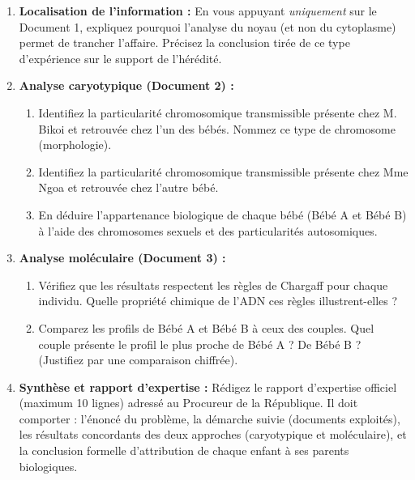 \documentclass[11pt]{article}
\newcounter{popsec}
\newcounter{popsub}
\newcommand{\courssub}[1]{%
  \stepcounter{popsub}%
  \par\vspace{9pt}\noindent{\popxbold\fontsize{11.5}{13}\selectfont\color{popink}{\color{poporange}\thepopsec.\thepopsub}\hspace{6pt}#1}\par\nopagebreak\vspace{4pt}
}
\begin{document}
\courssub{Consignes}
\begin{enumerate}
    \item \textbf{Localisation de l'information :} En vous appuyant \emph{uniquement} sur le Document 1, expliquez pourquoi l'analyse du noyau (et non du cytoplasme) permet de trancher l'affaire. Précisez la conclusion tirée de ce type d'expérience sur le support de l'hérédité.
    \item \textbf{Analyse caryotypique (Document 2) :}
    \begin{enumerate}
        \item Identifiez la particularité chromosomique transmissible présente chez M. Bikoi et retrouvée chez l'un des bébés. Nommez ce type de chromosome (morphologie).
        \item Identifiez la particularité chromosomique transmissible présente chez Mme Ngoa et retrouvée chez l'autre bébé.
        \item En déduire l'appartenance biologique de chaque bébé (Bébé A et Bébé B) à l'aide des chromosomes sexuels et des particularités autosomiques.
    \end{enumerate}
    \item \textbf{Analyse moléculaire (Document 3) :}
    \begin{enumerate}
        \item Vérifiez que les résultats respectent les règles de Chargaff pour chaque individu. Quelle propriété chimique de l'ADN ces règles illustrent-elles ?
        \item Comparez les profils de Bébé A et Bébé B à ceux des couples. Quel couple présente le profil le plus proche de Bébé A ? De Bébé B ? (Justifiez par une comparaison chiffrée).
    \end{enumerate}
    \item \textbf{Synthèse et rapport d'expertise :} Rédigez le rapport d'expertise officiel (maximum 10 lignes) adressé au Procureur de la République. Il doit comporter : l'énoncé du problème, la démarche suivie (documents exploités), les résultats concordants des deux approches (caryotypique et moléculaire), et la conclusion formelle d'attribution de chaque enfant à ses parents biologiques.
\end{enumerate}
\end{document}
